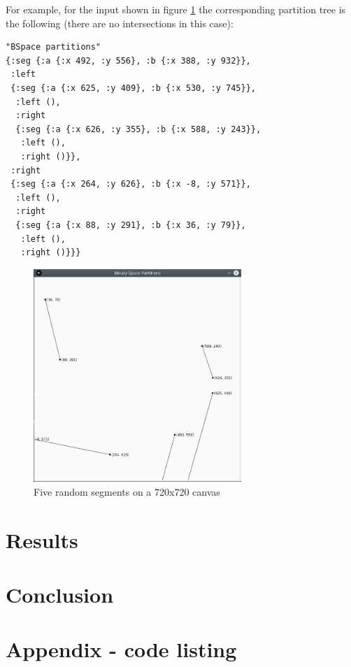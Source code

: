 \documentclass[12pt,a4paper]{article}
\begin{document}
For example, for the input shown in figure \ref{fig:sample-input} the
corresponding partition tree is the following (there are no
intersections in this case):

\begin{lstlisting}[frame=single]
"BSpace partitions"
{:seg {:a {:x 492, :y 556}, :b {:x 388, :y 932}},
 :left
 {:seg {:a {:x 625, :y 409}, :b {:x 530, :y 745}},
  :left (),
  :right
  {:seg {:a {:x 626, :y 355}, :b {:x 588, :y 243}},
   :left (),
   :right ()}},
 :right
 {:seg {:a {:x 264, :y 626}, :b {:x -8, :y 571}},
  :left (),
  :right
  {:seg {:a {:x 88, :y 291}, :b {:x 36, :y 79}},
   :left (),
   :right ()}}}
\end{lstlisting}

\begin{figure}[ht!]
  \centering
  \includegraphics[width=0.7\textwidth]{img/sample-input.png}
  \caption{Five random segments on a 720x720 canvas}
  \label{fig:sample-input}
\end{figure}


\section{Results}

\section{Conclusion}


\appendix
\section{Appendix - code listing}

\begin{verbatim}
\end{verbatim}

\nocite{*}


\end{document}
